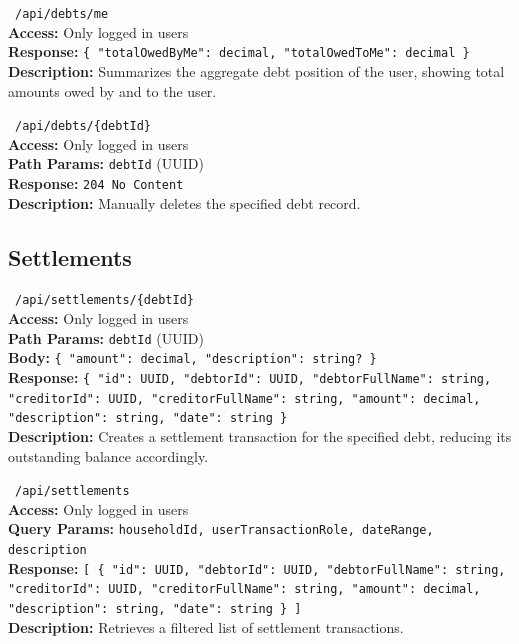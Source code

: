 \vspace{0.3cm}
\noindent \apiGET\ \texttt{/api/debts/me} \\
\textbf{Access:} Only logged in users \\
\textbf{Response:} \texttt{\{ "totalOwedByMe": decimal, "totalOwedToMe": decimal \}} \\
\textbf{Description:} Summarizes the aggregate debt position of the user, showing total amounts owed by and to the user.

\vspace{0.3cm}
\noindent \apiDELETE\ \texttt{/api/debts/\{debtId\}} \\
\textbf{Access:} Only logged in users \\
\textbf{Path Params:} \texttt{debtId} (UUID) \\
\textbf{Response:} \texttt{204 No Content} \\
\textbf{Description:} Manually deletes the specified debt record.

\subsection{Settlements}

\vspace{0.3cm}
\noindent \apiPOST\ \texttt{/api/settlements/\{debtId\}} \\
\textbf{Access:} Only logged in users \\
\textbf{Path Params:} \texttt{debtId} (UUID) \\
\textbf{Body:} \texttt{\{ "amount": decimal, "description": string? \}} \\
\textbf{Response:} \texttt{\{ "id": UUID, "debtorId": UUID, "debtorFullName": string, "creditorId": UUID, "creditorFullName": string, "amount": decimal, "description": string, "date": string \}} \\
\textbf{Description:} Creates a settlement transaction for the specified debt, reducing its outstanding balance accordingly.

\vspace{0.3cm}
\noindent \apiGET\ \texttt{/api/settlements} \\
\textbf{Access:} Only logged in users \\
\textbf{Query Params:} \texttt{householdId, userTransactionRole, dateRange, description} \\
\textbf{Response:} \texttt{[ \{ "id": UUID, "debtorId": UUID, "debtorFullName": string, "creditorId": UUID, "creditorFullName": string, "amount": decimal, "description": string, "date": string \} ]} \\
\textbf{Description:} Retrieves a filtered list of settlement transactions.

